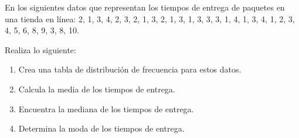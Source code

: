 \begin{exercise}
    En los siguientes datos que representan los tiempos de entrega de paquetes en una tienda en línea:
    2, 1, 3, 4, 2, 3, 2, 1, 3, 2, 1, 3, 1, 3, 3, 3, 1, 4, 1, 3, 4, 1, 2, 3, 4, 5, 6, 8, 9, 3, 8, 10.

    Realiza lo siguiente:
    \begin{enumerate}
        \item Crea una tabla de distribución de frecuencia para estos datos.
        \item Calcula la media de los tiempos de entrega.
        \item Encuentra la mediana de los tiempos de entrega.
        \item Determina la moda de los tiempos de entrega.
    \end{enumerate}
\end{exercise}

